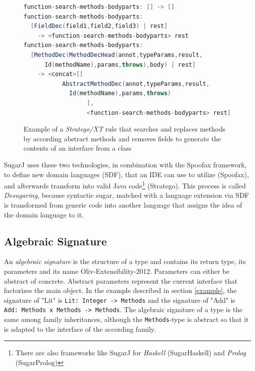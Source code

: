 \documentclass{report}
\begin{document}
\begin{figure}[H]
\begin{lstlisting}[language=java,breaklines=false,morekeywords={field1,field2,field3,annot,typeParams,result,methodName,params,throws,body,rest},keywordstyle=\bfseries\color{OliveGreen}]
function-search-methods-bodyparts: [] -> []
function-search-methods-bodyparts:
  [FieldDec(field1,field2,field3) | rest]
    -> <function-search-methods-bodyparts> rest
function-search-methods-bodyparts:
  [MethodDec(MethodDecHead(annot,typeParams,result,
      Id(methodName),params,throws),body) | rest]
    -> <concat>[[
		   AbstractMethodDec(annot,typeParams,result,
		     Id(methodName),params,throws)
		          ],
		          <function-search-methods-bodyparts> rest]
\end{lstlisting}
\caption{Example of a \emph{Stratego/XT} rule that searches and replaces methods by according abstract methods and removes fields to generate the contents of an interface from a class}
\label{exampleStrategoClassInterfaceTranslation}
\end{figure}


SugarJ uses these two technologies, in combination with the Spoofax framework, to define new domain languages (SDF), that an IDE can use to utilize (Spoofax), and afterwards transform into valid Java code\footnote{There are also frameworks like SugarJ for \emph{Haskell} (SugarHaskell) and \emph{Prolog} (SugarProlog)} (Stratego). This process is called \emph{Desugaring}, because syntactic sugar, matched with a language extension via SDF is transformed from generic code into another language that assigns the idea of the domain language to it.


\subsection{Algebraic Signature}

\label{albegraicSignature}

An \emph{algebraic signature} is the structure of a type and contains its return type, its parameters and its name {Oliv-Extensibility-2012}. Parameters can either be abstract of concrete. Abstract parameters represent the current interface that factorizes the main object. In the example described in section \ref{example}, the signature of "Lit" is \lstinline{Lit: Integer -> Methods} and the signature of "Add" is \lstinline{Add: Methods x Methods -> Methods}. The algebraic signature of a type is the same among family inheritances, although the \lstinline{Methods}-type is abstract so that it is adapted to the interface of the according family.
\end{document}
